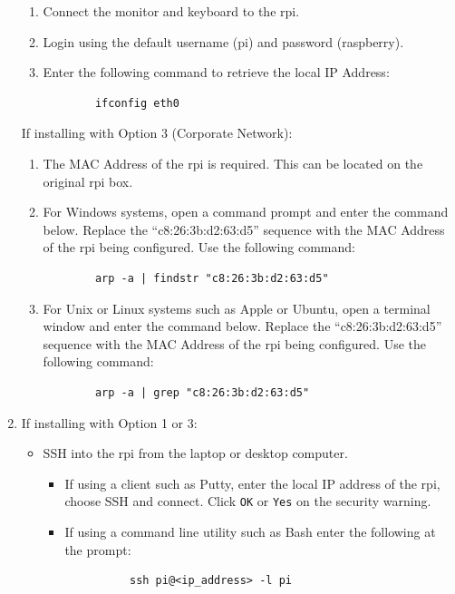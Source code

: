 \documentclass[12pt]{article}
\begin{document}
\begin{enumerate}
\begin{enumerate}
      \item Connect the monitor and keyboard to the \gls{rpi}.
      \item Login using the default username (pi) and password (raspberry).
      \item Enter the following command to retrieve the local IP Address:\\
      \begin{verbatim}
        ifconfig eth0
      \end{verbatim}
    \end{enumerate}
  If installing with Option 3 (Corporate Network):
    \begin{enumerate}
      \item The MAC Address of the \gls{rpi} is required. This can be
      located on the original \gls{rpi} box.
      \item For Windows systems, open a command prompt and enter the command
      below. Replace the ``c8:26:3b:d2:63:d5'' sequence with the MAC Address
      of the \gls{rpi} being configured.  Use the following command:
      \begin{verbatim}
        arp -a | findstr "c8:26:3b:d2:63:d5"
      \end{verbatim}
      \item For Unix or Linux systems such as Apple or Ubuntu, open a terminal
      window and enter the command below. Replace the ``c8:26:3b:d2:63:d5''
      sequence with the MAC Address of the \gls{rpi} being configured.
      Use the following command:
      \begin{verbatim}
        arp -a | grep "c8:26:3b:d2:63:d5"
      \end{verbatim}
    \end{enumerate}
  \item If installing with Option 1 or 3:
    \begin{itemize}
      \item SSH into the \gls{rpi} from the laptop or desktop computer.
      \begin{itemize}
        \item If using a client such as Putty, enter the local IP address
        of the \gls{rpi}, choose SSH and connect. Click \verb|OK| or
        \verb|Yes| on the security warning.
        \item If using a command line utility such as Bash enter the
        following at the prompt:
        \begin{verbatim}
          ssh pi@<ip_address> -l pi
        \end{verbatim}

\end{itemize}
\end{itemize}
\end{enumerate}
\end{document}
